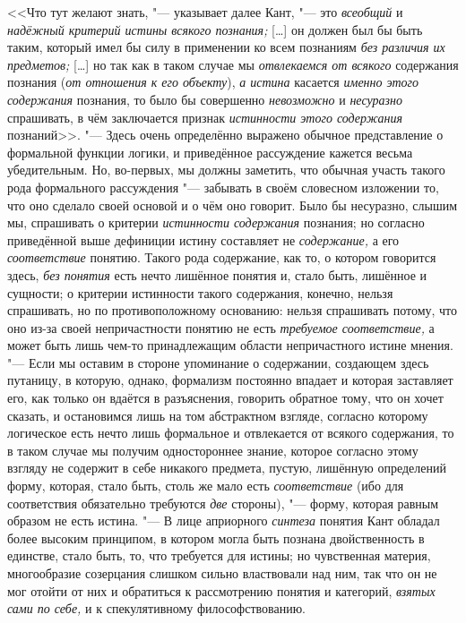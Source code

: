 <<Что тут желают знать, "--- указывает далее Кант,
"--- это {\em всеобщий} и {\em надёжный критерий
истины всякого познания;} [\ldots] он должен был бы быть таким,
который имел бы силу в применении ко всем познаниям
{\em без различия их предметов;} [\ldots] но так как в таком случае мы
{\em отвлекаемся от всякого} содержания познания
({\em от отношения к его объекту}), {\em а истина} касается
{\em именно этого содержания} познания, то было бы совершенно
{\em невозможно} и {\em несуразно} спрашивать, в чём заключается признак
{\em истинности этого содержания} познаний>>.
"--- Здесь очень определённо выражено обычное представление о
формальной функции логики, и приведённое рассуждение кажется весьма
убедительным. Но, во-первых, мы должны заметить, что обычная участь такого
рода формального рассуждения "--- забывать в своём словесном
изложении то, что оно сделало своей основой и о чём оно говорит. Было бы
несуразно, слышим мы, спрашивать о критерии {\em истинности содержания}
познания; но согласно приведённой выше дефиниции истину
составляет не {\em содержание,} а его {\em соответствие}
понятию. Такого рода содержание, как то, о котором говорится
здесь, {\em без понятия} есть нечто лишённое понятия и, стало быть,
лишённое и сущности; о критерии истинности такого содержания, конечно,
нельзя спрашивать, но по противоположному основанию: нельзя спрашивать
потому, что оно из-за своей непричастности понятию не есть
{\em требуемое соответствие,}
а может быть лишь чем-то принадлежащим области непричастного
истине мнения. "--- Если мы оставим в стороне упоминание о
содержании, создающем здесь путаницу, в которую, однако, формализм
постоянно впадает и которая заставляет его, как только он вдаётся в
разъяснения, говорить обратное тому, что он хочет сказать, и остановимся
лишь на том абстрактном взгляде, согласно которому логическое есть нечто
лишь формальное и отвлекается от всякого содержания, то в таком случае мы
получим одностороннее знание, которое согласно этому взгляду не содержит в
себе никакого предмета, пустую, лишённую определений форму, которая, стало
быть, столь же мало есть {\em соответствие} (ибо
для соответствия обязательно требуются {\em две} стороны), "---
форму, которая равным образом не есть истина. "---
В лице априорного {\em синтеза} понятия
Кант обладал более высоким принципом, в котором могла быть познана
двойственность в единстве, стало быть, то, что требуется для истины; но
чувственная материя, многообразие созерцания слишком сильно властвовали над
ним, так что он не мог отойти от них и обратиться к рассмотрению понятия и
категорий, {\em взятых сами по себе,} и к спекулятивному философствованию.

